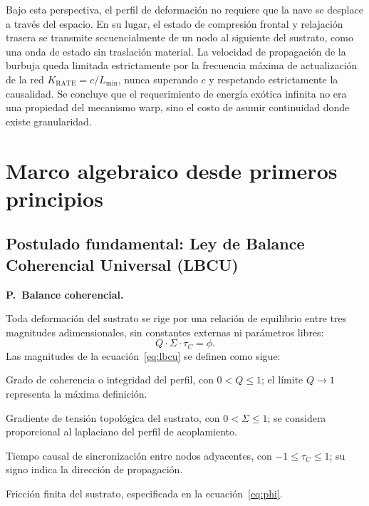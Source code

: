 \documentclass[10pt,a4paper,twocolumn]{article}
\newcounter{parrafoecuacion}
\newcommand{\parrafoecuacion}[2]{%
    \par\smallskip\Needspace{6\baselineskip}%
    \noindent\refstepcounter{parrafoecuacion}\label{#1}%
    \textbf{P\theparrafoecuacion.\ #2.}\enspace
}
\begin{document}
Bajo esta perspectiva, el perfil de deformación no requiere que la nave se desplace a través del espacio. En su lugar, el estado de compresión frontal y relajación trasera se transmite secuencialmente de un nodo al siguiente del sustrato, como una onda de estado sin traslación material. La velocidad de propagación de la burbuja queda limitada estrictamente por la frecuencia máxima de actualización de la red \(K_{\text{RATE}} = c / L_{\text{min}}\), nunca superando \(c\) y respetando estrictamente la causalidad. Se concluye que el requerimiento de energía exótica infinita no era una propiedad del mecanismo warp, sino el costo de asumir continuidad donde existe granularidad.

\section{Marco algebraico desde primeros principios}
\label{sec:marco_lbcu}

\subsection{Postulado fundamental: Ley de Balance Coherencial Universal (LBCU)}
\parrafoecuacion{par:lbcu}{Balance coherencial}
Toda deformación del sustrato se rige por una relación de equilibrio entre tres magnitudes adimensionales, sin constantes externas ni parámetros libres:
\begin{equation}
    Q \cdot \Sigma \cdot \tau_C = \phi.
    \label{eq:lbcu}
\end{equation}
Las magnitudes de la ecuación~\eqref{eq:lbcu} se definen como sigue:
\begin{description}[style=nextline,leftmargin=1em,labelindent=0pt,itemsep=4pt,parsep=0pt]
    \item[$Q$: coherencia del perfil.]
    Grado de coherencia o integridad del perfil, con $0 < Q \leq 1$; el límite $Q \to 1$ representa la máxima definición.
    \item[$\Sigma$: tensión topológica.]
    Gradiente de tensión topológica del sustrato, con $0 < \Sigma \leq 1$; se considera proporcional al laplaciano del perfil de acoplamiento.
    \item[$\tau_C$: tiempo causal.]
    Tiempo causal de sincronización entre nodos adyacentes, con $-1 \leq \tau_C \leq 1$; su signo indica la dirección de propagación.
    \item[$\phi$: fricción topológica.]
    Fricción finita del sustrato, especificada en la ecuación~\eqref{eq:phi}.
\end{description}
\end{document}
